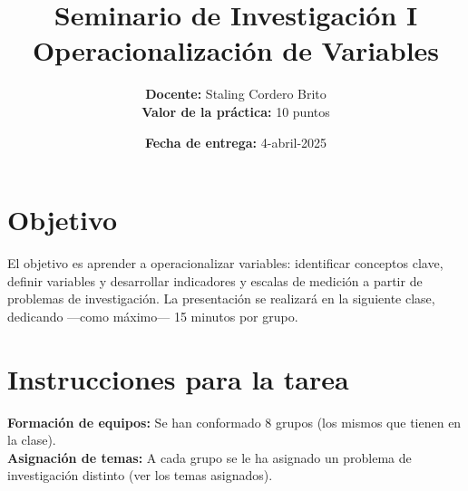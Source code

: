 \documentclass[12pt]{article}
\title{\textbf{Seminario de Investigación I \\ Operacionalización de Variables}}
\author{\textbf{Docente:} Staling Cordero Brito \\
\textbf{Valor de la práctica:} 10 puntos}
\date{\textbf{Fecha de entrega:} 4-abril-2025}
\begin{document}
\maketitle

\section*{Objetivo}
El objetivo es aprender a operacionalizar variables: identificar conceptos clave, definir variables y desarrollar indicadores y escalas de medición a partir de problemas de investigación. La presentación se realizará en la siguiente clase, dedicando —como máximo— 15 minutos por grupo.

\section*{Instrucciones para la tarea}

\checkmark \textbf{Formación de equipos:} Se han conformado 8 grupos (los mismos que tienen en la clase). \\

\checkmark \textbf{Asignación de temas:} A cada grupo se le ha asignado un problema de investigación distinto (ver los temas asignados). 
\end{document}
